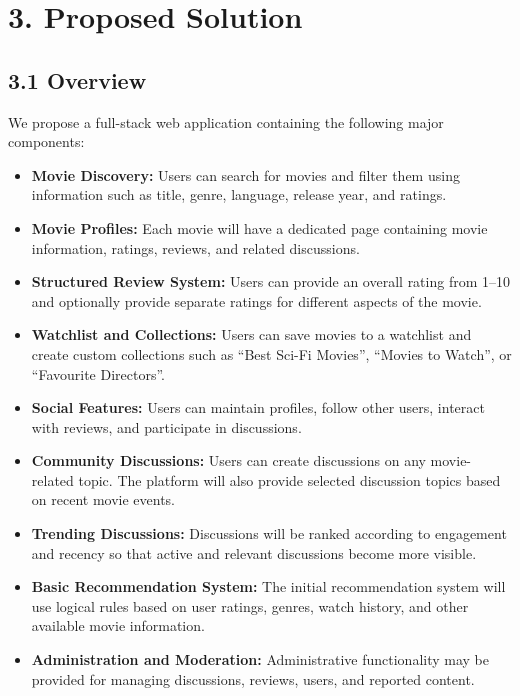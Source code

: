 \documentclass[11pt,a4paper]{article}
\begin{document}

\section{3. Proposed Solution}

\subsection{3.1 Overview}

We propose a full-stack web application containing the following major components:

\begin{itemize}

    \item \textbf{Movie Discovery:}
    Users can search for movies and filter them using information such as title, genre, language, release year, and ratings.

    \item \textbf{Movie Profiles:}
    Each movie will have a dedicated page containing movie information, ratings, reviews, and related discussions.

    \item \textbf{Structured Review System:}
    Users can provide an overall rating from 1--10 and optionally provide separate ratings for different aspects of the movie.

    \item \textbf{Watchlist and Collections:}
    Users can save movies to a watchlist and create custom collections such as ``Best Sci-Fi Movies'', ``Movies to Watch'', or ``Favourite Directors''.

    \item \textbf{Social Features:}
    Users can maintain profiles, follow other users, interact with reviews, and participate in discussions.

    \item \textbf{Community Discussions:}
    Users can create discussions on any movie-related topic. The platform will also provide selected discussion topics based on recent movie events.

    \item \textbf{Trending Discussions:}
    Discussions will be ranked according to engagement and recency so that active and relevant discussions become more visible.

    \item \textbf{Basic Recommendation System:}
    The initial recommendation system will use logical rules based on user ratings, genres, watch history, and other available movie information.

    \item \textbf{Administration and Moderation:}
    Administrative functionality may be provided for managing discussions, reviews, users, and reported content.

\end{itemize}
\end{document}
